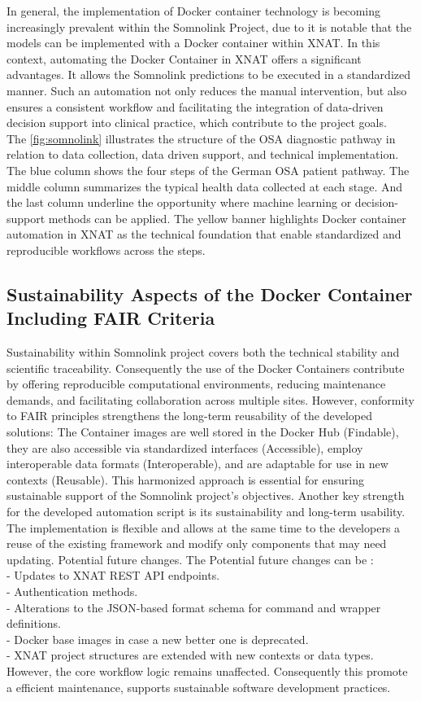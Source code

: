 In general, the implementation of Docker container technology is becoming increasingly prevalent within the Somnolink Project, due to it is notable that the models can be implemented with a Docker container within XNAT.
In this context, automating the Docker Container in XNAT offers a significant advantages. It allows the Somnolink predictions to be executed in a standardized manner. Such an automation not only reduces the manual intervention, but also ensures a consistent  workflow and facilitating the integration of data-driven decision support into clinical practice, which contribute to the project goals.\\
The \autoref{fig:somnolink} illustrates the structure of the OSA diagnostic pathway in relation to data collection, data driven support, and technical implementation.
The blue column shows the four steps of the German OSA patient pathway. The middle column summarizes the typical health data collected at each stage. And the last column underline the opportunity where machine learning or decision-support methods can be applied. 
The yellow banner highlights Docker container automation in XNAT  as the technical foundation that enable standardized and reproducible workflows across the steps.

\subsection{Sustainability Aspects of the Docker Container Including FAIR Criteria}
Sustainability within Somnolink project covers both the technical stability and scientific traceability. Consequently the use of the Docker Containers contribute by offering reproducible computational environments, reducing maintenance demands, and facilitating collaboration across multiple sites. However, conformity to FAIR principles strengthens the long-term reusability of the developed solutions: The Container images are well stored in the Docker Hub (Findable), they are also accessible via standardized interfaces (Accessible), employ interoperable data formats (Interoperable), and are adaptable for use in new contexts (Reusable). This harmonized approach is essential for ensuring sustainable support of the Somnolink project’s objectives. 
Another key strength for the developed automation script is its sustainability and long-term usability. The implementation is flexible and allows at the same time to the developers a reuse of the existing framework and modify only components that may need updating. Potential future changes. The Potential future changes can be :\\
- Updates to XNAT REST API endpoints.\\
- Authentication methods.\\
-  Alterations to the JSON-based format schema for command and wrapper definitions.\\
-  Docker base images in case a new better one is deprecated.\\
- XNAT project structures are extended with new contexts or data types.\\
However, the core workflow logic remains unaffected. Consequently this promote a efficient maintenance, supports sustainable software development practices.


